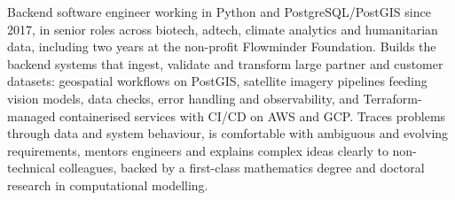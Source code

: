 
\begin{cvparagraph}

Backend software engineer working in Python and PostgreSQL/PostGIS since 2017, in senior roles across biotech, adtech, climate analytics and humanitarian data, including two years at the non-profit Flowminder Foundation. Builds the backend systems that ingest, validate and transform large partner and customer datasets: geospatial workflows on PostGIS, satellite imagery pipelines feeding vision models, data checks, error handling and observability, and Terraform-managed containerised services with CI/CD on AWS and GCP. Traces problems through data and system behaviour, is comfortable with ambiguous and evolving requirements, mentors engineers and explains complex ideas clearly to non-technical colleagues, backed by a first-class mathematics degree and doctoral research in computational modelling.

\end{cvparagraph}
